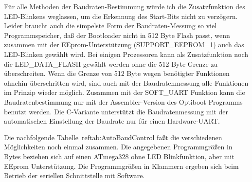 Für alle Methoden der Baudraten-Bestimmung würde ich die Zusatzfunktion des
LED-Blinkens weglassen, um die Erkennung des Start-Bits nicht zu verzögern.
Leider braucht auch die simpelste Form der Baudraten-Messung so viel
Programmspeicher, daß der Bootloader nicht in 512 Byte Flash passt,
wenn zusammen mit der EEprom-Unterstützung (SUPPORT\_EEPROM=1) auch
das LED-Blinken gewählt wird.
Bei einigen Prozessoren kann als Zusatzfunktion noch die LED\_DATA\_FLASH
gewählt werden ohne die 512 Byte Grenze zu überschreiten. 
Wenn die Grenze von 512 Byte wegen benötigter Funktionen ohnehin überschritten
wird, sind auch mit der Baudratenmessung alle Funktionen im Prinzip
wieder möglich. 
Zusammen mit der SOFT\_UART Funktion kann die Baudratenbestimmung nur mit
der Assembler-Version des Optiboot Programms benutzt werden.
Die C-Variante unterstützt die Baudratenmessung mit der automatischen Einstellung
der Baudrate nur für einen Hardware-UART.

Die nachfolgende Tabelle~ref{tab:AutoBaudControl} faßt die verschiedenen Möglichkeiten noch einmal zusammen.
Die angegebenen Programmgrößen in Bytes beziehen sich auf einen  ATmega328 ohne LED Blinkfunktion, aber mit
EEprom Unterstützung. Die Programmgrößen in Klammern ergeben sich beim Betrieb der seriellen Schnittstelle mit
Software.

